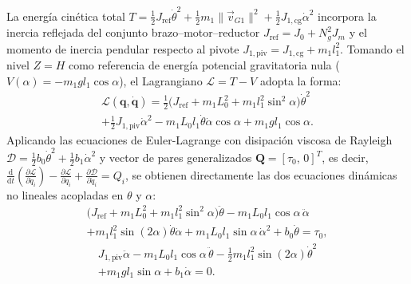 La energía cinética total $T = \frac{1}{2}J_{\text{ref}}\dot{\theta}^2 + \frac{1}{2}m_1\|\vec{v}_{G1}\|^2 + \frac{1}{2}J_{1,\text{cg}}\dot{\alpha}^2$ incorpora la inercia reflejada del conjunto brazo--motor--reductor $J_{\text{ref}} = J_0 + N_g^2 J_m$ y el momento de inercia pendular respecto al pivote $J_{1,\text{piv}} = J_{1,\text{cg}} + m_1 l_1^2$. Tomando el nivel $Z=H$ como referencia de energía potencial gravitatoria nula ($V(\alpha)=-m_1 g l_1\cos\alpha$), el Lagrangiano $\mathcal{L}=T-V$ adopta la forma:
\begin{multline}
    \mathcal{L}(\mathbf{q},\dot{\mathbf{q}}) = \frac{1}{2}\bigl(J_{\text{ref}} + m_1 L_0^2 + m_1 l_1^2\sin^2\alpha\bigr)\dot{\theta}^2 \\
    + \frac{1}{2}J_{1,\text{piv}}\dot{\alpha}^2 - m_1 L_0 l_1\dot{\theta}\dot{\alpha}\cos\alpha + m_1 g l_1\cos\alpha.
    \label{eq:lagrangiano}
\end{multline}
Aplicando las ecuaciones de Euler-Lagrange con disipación viscosa de Rayleigh $\mathcal{D} = \frac{1}{2}b_0\dot{\theta}^2 + \frac{1}{2}b_1\dot{\alpha}^2$ y vector de pares generalizados $\mathbf{Q}=[\tau_0,\,0]^T$, es decir, $\frac{\mathrm{d}}{\mathrm{d}t}\!\left(\frac{\partial\mathcal{L}}{\partial\dot{q}_i}\right)-\frac{\partial\mathcal{L}}{\partial q_i}+\frac{\partial\mathcal{D}}{\partial\dot{q}_i}=Q_i$, se obtienen directamente las dos ecuaciones dinámicas no lineales acopladas en $\theta$ y $\alpha$:
\begin{multline}
    \bigl(J_{\text{ref}} + m_1 L_0^2 + m_1 l_1^2\sin^2\alpha\bigr)\ddot{\theta} - m_1 L_0 l_1\cos\alpha\,\ddot{\alpha} \\
    + m_1 l_1^2\sin(2\alpha)\dot{\theta}\dot{\alpha} + m_1 L_0 l_1\sin\alpha\,\dot{\alpha}^2 + b_0\dot{\theta} = \tau_0,
    \label{eq:dinamica_theta}
\end{multline}
\begin{multline}
    J_{1,\text{piv}}\ddot{\alpha} - m_1 L_0 l_1\cos\alpha\,\ddot{\theta} - \frac{1}{2}m_1 l_1^2\sin(2\alpha)\dot{\theta}^2 \\
    + m_1 g l_1\sin\alpha + b_1\dot{\alpha} = 0.
    \label{eq:dinamica_alpha}
\end{multline}


